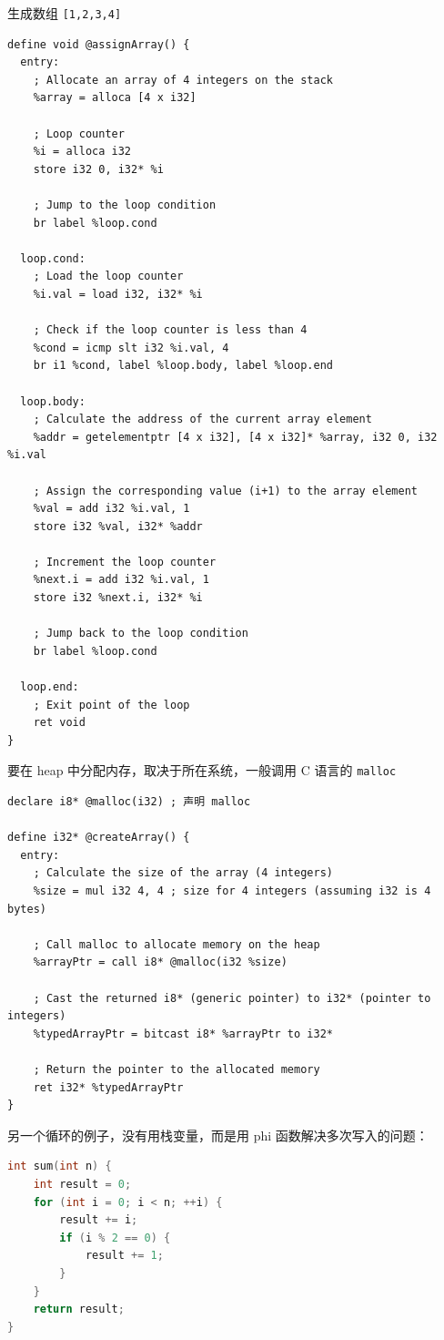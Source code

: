 生成数组 \verb`[1,2,3,4]`
\begin{lstlisting}[language=none]
define void @assignArray() {
  entry:
    ; Allocate an array of 4 integers on the stack
    %array = alloca [4 x i32]

    ; Loop counter
    %i = alloca i32
    store i32 0, i32* %i

    ; Jump to the loop condition
    br label %loop.cond

  loop.cond:
    ; Load the loop counter
    %i.val = load i32, i32* %i

    ; Check if the loop counter is less than 4
    %cond = icmp slt i32 %i.val, 4
    br i1 %cond, label %loop.body, label %loop.end

  loop.body:
    ; Calculate the address of the current array element
    %addr = getelementptr [4 x i32], [4 x i32]* %array, i32 0, i32 %i.val

    ; Assign the corresponding value (i+1) to the array element
    %val = add i32 %i.val, 1
    store i32 %val, i32* %addr

    ; Increment the loop counter
    %next.i = add i32 %i.val, 1
    store i32 %next.i, i32* %i

    ; Jump back to the loop condition
    br label %loop.cond

  loop.end:
    ; Exit point of the loop
    ret void
}
\end{lstlisting}

要在 heap 中分配内存，取决于所在系统，一般调用 C 语言的 \verb`malloc`
\begin{lstlisting}[language=none]
declare i8* @malloc(i32) ; 声明 malloc

define i32* @createArray() {
  entry:
    ; Calculate the size of the array (4 integers)
    %size = mul i32 4, 4 ; size for 4 integers (assuming i32 is 4 bytes)

    ; Call malloc to allocate memory on the heap
    %arrayPtr = call i8* @malloc(i32 %size)

    ; Cast the returned i8* (generic pointer) to i32* (pointer to integers)
    %typedArrayPtr = bitcast i8* %arrayPtr to i32*

    ; Return the pointer to the allocated memory
    ret i32* %typedArrayPtr
}
\end{lstlisting}


另一个循环的例子，没有用栈变量，而是用 phi 函数解决多次写入的问题：
\begin{lstlisting}[language=cpp]
int sum(int n) {
    int result = 0;
    for (int i = 0; i < n; ++i) {
        result += i;
        if (i % 2 == 0) {
            result += 1;
        }
    }
    return result;
}
\end{lstlisting}

